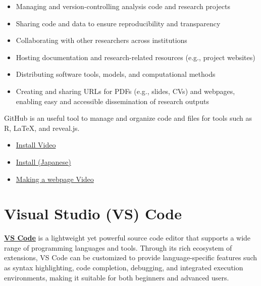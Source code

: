 \documentclass[11pt]{article}
\begin{document}
\begin{itemize}
\item Managing and version-controlling analysis code and research projects
\item Sharing code and data to ensure reproducibility and transparency
\item Collaborating with other researchers across institutions
\item Hosting documentation and research-related resources (e.g., project websites)
\item Distributing software tools, models, and computational methods
\item Creating and sharing URLs for PDFs (e.g., slides, CVs) and webpages, enabling easy and accessible dissemination of research outputs
\end{itemize}
GitHub is an useful tool to manage and organize code and files for tools 
such as R, LaTeX, and reveal.js.
\begin{itemize}
\item \href{https://www.youtube.com/watch?v=wDRoduig_98}{Install Video}
\item \href{https://www.kagoya.jp/howto/it-glossary/develop/howtousegithub/}{Install (Japanese)}
\item \href{https://www.youtube.com/watch?v=Pof342wGt78}{Making a webpage Video}
\end{itemize}


\section{Visual Studio (VS) Code}

\href{https://code.visualstudio.com/download}{\textbf{VS Code}} is 
a lightweight yet powerful source code editor that supports a wide range of programming languages and tools. Through its rich ecosystem of extensions, VS Code can be customized to provide language-specific features such as syntax highlighting, code completion, debugging, and integrated execution environments, making it suitable for both beginners and advanced users.
\end{document}
